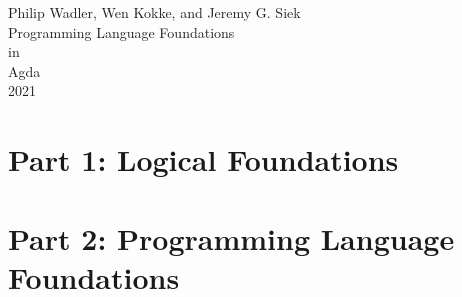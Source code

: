 \documentclass[10pt]{book}
\begin{document}
\setlength{\mathindent}{0pt}

\providecommand{\tightlist}{%
  \setlength{\itemsep}{0pt}\setlength{\parskip}{0pt}}

\newlength{\drop}
\newcommand*{\titleAM}{\begingroup%
\setlength{\drop}{0.12\textheight}
\centering
\vspace*{\drop}
{\large Philip Wadler, Wen Kokke, and Jeremy G. Siek}\\[\baselineskip]
\vspace*{\drop}
{\Huge Programming Language Foundations}\\[\baselineskip]
{\Huge in}\\[\baselineskip]
{\Huge Agda}\\[\drop]
\vfill
{\Large \scshape 2021}\par
\null\endgroup}



\begin{titlepage}
\titleAM
\end{titlepage}
\frontmatter
\setcounter{tocdepth}{0}
\tableofcontents
\setcounter{tocdepth}{1}




\mainmatter
\part{Part 1: Logical Foundations}
  
  
\part{Part 2: Programming Language Foundations}
  
  
\end{document}
